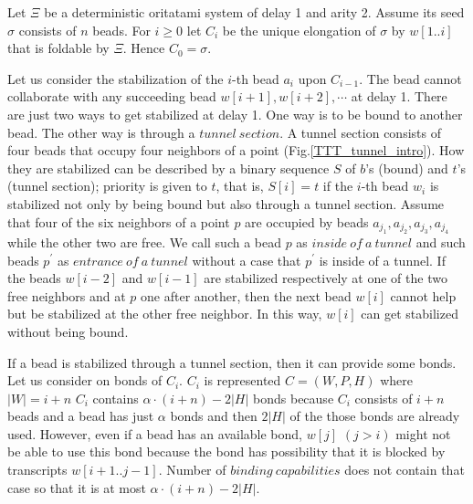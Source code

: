 \documentclass[runningheads]{llncs}
\begin{document}


Let $\Xi$ be a deterministic oritatami system of delay 1 and arity 2. Assume its seed $\sigma$ consists of $n$ beads.
For $i \geq 0$ let $C_i$ be the unique elongation of $\sigma$ by $w[1..i]$ that is foldable by $\Xi$. Hence $C_0 = \sigma$.


Let us consider the stabilization of the $i$-th bead $a_i$ upon $C_{i-1}$. The bead cannot collaborate with any succeeding bead $w[i+1],w[i+2],\cdots$ at delay 1. There are just two ways to get stabilized at delay 1. One way is to be bound to another bead. The other way is through a $tunnel\ section$. A tunnel section consists of four beads that occupy four neighbors of a point (Fig.\ref{TTT_tunnel_intro}). 
How they are stabilized can be described by a binary sequence $S$ of $b$'s (bound) and $t$'s (tunnel section); priority is given to $t$, that is, $S[i] = t$ if the $i$-th bead $w_i$ is stabilized not only by being bound but also through a tunnel section. 
Assume that four of the six neighbors of a point $p$ are occupied by beads $a_{j_1},a_{j_2},a_{j_3},a_{j_4}$ while the other two are free. We call such a bead $p$ as $inside\ of\ a\ tunnel$ and such beads $p^\prime$ as $entrance\ of\ a\ tunnel$ without a case that $p^\prime$ is inside of a tunnel. If the beads $w[i-2]$ and $w[i-1]$ are stabilized respectively at one of the two free neighbors and at $p$ one after another, then the next bead $w[i]$ cannot help but be stabilized at the other free neighbor. In this way, $w[i]$ can get stabilized without being bound.



If a bead is stabilized through a tunnel section, then it can provide some bonds. Let us consider on bonds of $C_i$. $C_i$ is represented $C = (W,P,H)$ where $|W| = i + n$ $C_i$ contains $\alpha \cdot (i + n) - 2|H|$ bonds because $C_i$ consists of $i + n$ beads and a bead has just $\alpha$ bonds and then $2 |H|$ of the those bonds are already used. However, even if a bead has an available bond, $w[j]$ $(j > i)$ might not be able to use this bond because the bond has possibility that it is blocked by transcripts $w[i+1..j-1]$. Number of $binding\ capabilities$ does not contain that case so that it is at most $\alpha \cdot (i + n) - 2|H|$.
\end{document}
